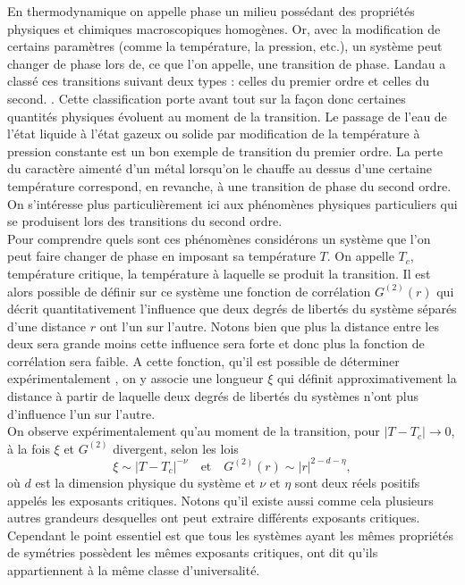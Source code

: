 \documentclass[10pt]{article}
\begin{document}
\begin{multicols}{2}
En thermodynamique on appelle phase un milieu possédant des propriétés physiques et chimiques macroscopiques homogènes. Or, avec la modification de certains paramètres (comme la température, la pression, etc.), un système peut changer de phase lors de, ce que l'on appelle, une transition de phase. Landau a classé ces transitions suivant deux types : celles du premier ordre et celles du second. \cite{}. Cette classification porte avant tout sur la façon donc certaines quantités physiques évoluent au moment de la transition. Le passage de l'eau de l'état liquide à l'état gazeux ou solide par modification de la température à pression constante est un bon exemple \cite{} de transition du premier ordre. La perte du caractère aimenté d'un métal lorsqu'on le chauffe au dessus d'une certaine température correspond, en revanche, à une transition de phase du second ordre. On s'intéresse plus particulièrement ici aux phénomènes physiques particuliers qui se produisent lors des transitions du second ordre. \\

Pour comprendre quels sont ces phénomènes considérons un système que l'on peut faire changer de phase en imposant sa température $T$. On appelle $T_c$, température critique, la température à laquelle se produit la transition. Il est alors possible de définir sur ce système une fonction de corrélation $G^{(2)}(r)$ qui décrit quantitativement l'influence que deux degrés de libertés du système séparés d'une distance $r$ ont l'un sur l'autre. Notons bien que plus la distance entre les deux sera grande moins cette influence sera forte et donc plus la fonction de corrélation sera faible. A cette fonction, qu'il est possible de déterminer expérimentalement \cite{Bellac2012}, on y associe une longueur $\xi$ qui définit approximativement la distance à partir de laquelle deux degrés de libertés du systèmes n'ont plus d'influence l'un sur l'autre.\\

On observe expérimentalement qu'au moment de la transition, pour $|T-T_c| \rightarrow 0$, à la fois $\xi$ et $G^{(2)}$ divergent, selon les lois 
\begin{equation}
	\xi \sim |T-T_c|^{-\nu} 	\quad \text{et} \quad G^{(2)}(r) \sim |r|^{2-d-\eta},
\end{equation}
où $d$ est la dimension physique du système et $\nu$ et $\eta$ sont deux réels positifs appelés les exposants critiques. Notons qu'il existe aussi comme cela plusieurs autres grandeurs desquelles ont peut extraire différents exposants critiques. Cependant le point essentiel est que tous les systèmes ayant les mêmes propriétés de symétries possèdent les mêmes exposants critiques, ont dit qu'ils appartiennent à la même classe d'universalité.\\



\end{multicols}
\end{document}
